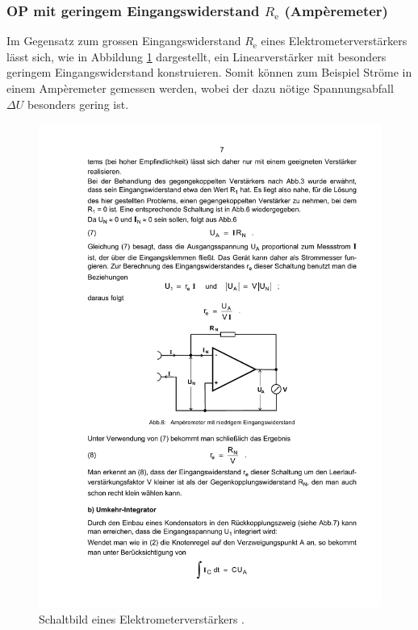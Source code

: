 \subsubsection{OP mit geringem Eingangswiderstand $R_\text{e}$ (Ampèremeter)}
\label{subsubsec:amperemeter}
Im Gegensatz zum grossen Eingangswiderstand $R_\text{e}$ eines 
Elektrometerverstärkers lässt sich, wie in Abbildung
\ref{fig:amperemeter} dargestellt, ein Linearverstärker mit 
besonders geringem Eingangswiderstand konstruieren.
Somit können zum Beispiel Ströme in einem Ampèremeter gemessen werden, wobei
der dazu nötige Spannungsabfall $\Delta U$ besonders gering ist.
\begin{figure}
    \centering
    \includegraphics[width=0.7\linewidth]{img/amperemeter.pdf}
    \caption{Schaltbild eines Elektrometerverstärkers \cite{V51}.}
    \label{fig:amperemeter}
\end{figure}

